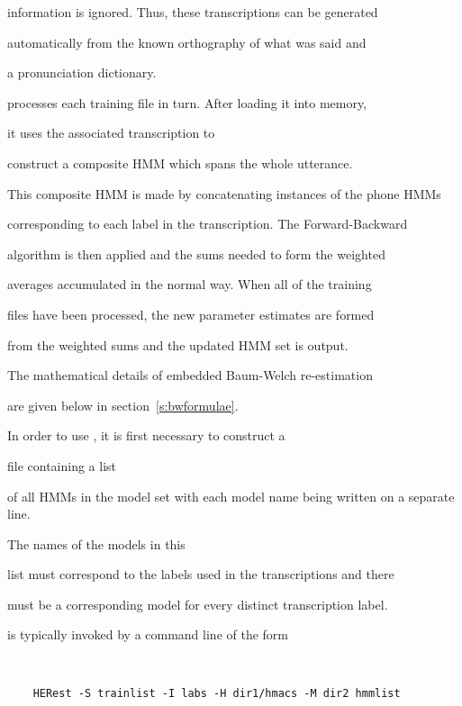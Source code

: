 information is ignored.  Thus, these transcriptions can be generated


automatically from the known orthography of what was said and 


a pronunciation dictionary.





 processes each training file in turn.  After loading it into memory,


it uses the associated transcription to 


construct a  composite HMM which spans the whole utterance.


This composite HMM is made by concatenating instances of the phone HMMs 


corresponding to each label in the transcription.  The Forward-Backward


algorithm is then applied and the sums needed to form the weighted


averages accumulated in the normal way.  When all of the training


files have been processed, the new parameter estimates are formed


from the weighted sums and the updated HMM set is output.







The mathematical details of embedded Baum-Welch re-estimation


are given below in section~\ref{s:bwformulae}.





In order to use , it is first necessary to construct a 


file containing a list


of all HMMs in the model set with each model name being written on a separate line.


The names of the models in this


list must correspond to the labels used in the transcriptions and there


must be a corresponding model for every distinct transcription label.


 is typically invoked by a command line of the form


\begin{verbatim}


    HERest -S trainlist -I labs -H dir1/hmacs -M dir2 hmmlist


\end{verbatim}


